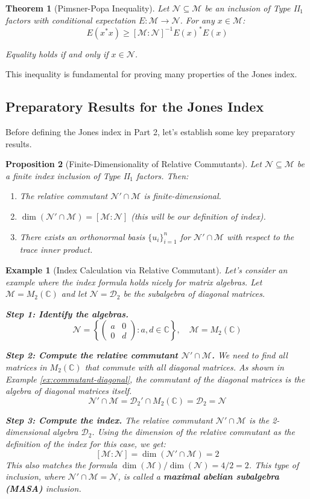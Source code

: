 \documentclass[11pt, a4paper]{article}
\theoremstyle{colored_def}
\theoremstyle{colored_thm}
\newtheorem{theorem}{Theorem}[section]
\newtheorem{proposition}[theorem]{Proposition}
\theoremstyle{colored_ex}
\newtheorem{example}{Example}[section]
\newcommand{\C}{\mathbb{C}}
\newcommand{\M}{\mathcal{M}}
\newcommand{\N}{\mathcal{N}}
\begin{document}
\begin{theorem}[Pimsner-Popa Inequality]\label{thm:pimsner-popa}
Let $\N \subseteq \M$ be an inclusion of Type II$_1$ factors with conditional expectation $E: \M \to \N$. For any $x \in \M$:
$$ E(x^*x) \geq [\M : \N]^{-1} E(x)^* E(x) $$

Equality holds if and only if $x \in \N$.
\end{theorem}

This inequality is fundamental for proving many properties of the Jones index.

\subsection{Preparatory Results for the Jones Index}

Before defining the Jones index in Part 2, let's establish some key preparatory results.

\begin{proposition}[Finite-Dimensionality of Relative Commutants]\label{prop:finite-dim-rel-comm}
Let $\N \subseteq \M$ be a finite index inclusion of Type II$_1$ factors. Then:
\begin{enumerate}
    \item The relative commutant $\N' \cap \M$ is finite-dimensional.
    \item $\dim(\N' \cap \M) = [\M : \N]$ (this will be our definition of index).
    \item There exists an orthonormal basis $\{u_i\}_{i=1}^n$ for $\N' \cap \M$ with respect to the trace inner product.
\end{enumerate}
\end{proposition}

\begin{example}[Index Calculation via Relative Commutant]\label{ex:index-via-rel-comm}
Let's consider an example where the index formula holds nicely for matrix algebras. Let $\M = M_2(\C)$ and let $\N = \mathcal{D}_2$ be the subalgebra of diagonal matrices.

\textbf{Step 1: Identify the algebras.}
$$ \N = \left\{ \begin{pmatrix} a & 0 \\ 0 & d \end{pmatrix} : a, d \in \C \right\}, \quad \M = M_2(\C) $$

\textbf{Step 2: Compute the relative commutant $\N' \cap \M$.}
We need to find all matrices in $M_2(\C)$ that commute with all diagonal matrices. As shown in Example \ref{ex:commutant-diagonal}, the commutant of the diagonal matrices is the algebra of diagonal matrices itself.
$$ \N' \cap \M = \mathcal{D}_2' \cap M_2(\C) = \mathcal{D}_2 = \N $$

\textbf{Step 3: Compute the index.}
The relative commutant $\N' \cap \M$ is the 2-dimensional algebra $\mathcal{D}_2$. Using the dimension of the relative commutant as the definition of the index for this case, we get:
$$ [\M : \N] = \dim(\N' \cap \M) = 2 $$
This also matches the formula $\dim(\M) / \dim(\N) = 4/2 = 2$. This type of inclusion, where $\N' \cap \M = \N$, is called a \textbf{maximal abelian subalgebra (MASA)} inclusion.
\end{example}
\end{document}
